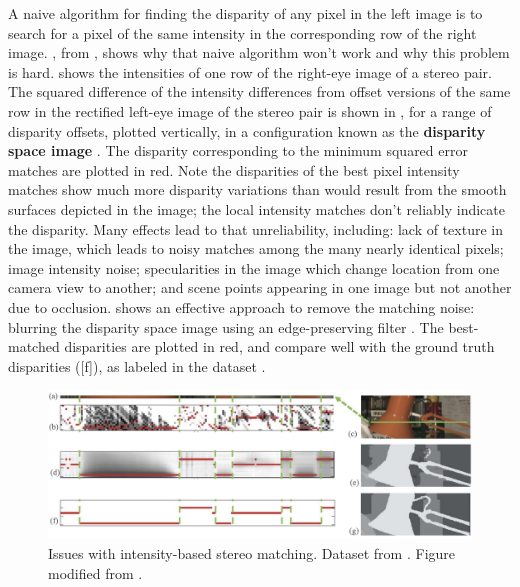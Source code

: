 A naive algorithm for finding the disparity of any pixel in the left image is to search for a pixel of the same intensity  in the corresponding row of the right image.  \Fig{\ref{fig:stereolamp}}, from \cite{Hosni2013}, shows why that naive algorithm won't work and why this problem is hard.  shows the intensities of one row of the right-eye image of a stereo pair. The squared difference of the intensity differences from offset versions of the same row in the rectified left-eye image of the stereo pair is shown in , for a range of disparity offsets, plotted vertically, in a configuration known as the {\bf disparity space image} \cite{Scharstein2002}.  The disparity corresponding to the minimum squared error matches are plotted in red.  Note the disparities of the best pixel intensity matches show much more disparity variations than would result from the smooth surfaces depicted in the image; the local intensity matches don't reliably indicate the disparity.  Many effects lead to that unreliability, including: lack of texture in the image, which leads to noisy matches among the many nearly identical pixels; image intensity noise; specularities in the image which change location from one camera view to another; and scene points appearing in one image but not another due to occlusion.  shows an effective approach to remove the matching noise:  blurring the disparity space image using an edge-preserving filter \cite{Hosni2013}.  The best-matched disparities are plotted in red, and compare well with the ground truth disparities (\fig{\ref{fig:stereolamp}}[f]), as labeled in the dataset \cite{Scharstein2002}.


\begin{figure}[t]
\centerline{
\includegraphics[width=1\linewidth]{figures/stereo/stereolamp.jpg}}
\caption{Issues with intensity-based stereo matching.
Dataset from \cite{Scharstein2002}. Figure modified from \cite{Hosni2013}.}
\label{fig:stereolamp}
\end{figure}

